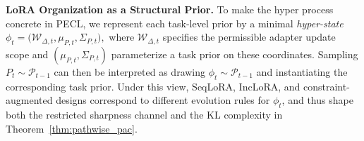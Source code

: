 \documentclass[10pt]{article} %
\begin{document}



\noindent\textbf{LoRA Organization as a Structural Prior.}\quad 
To make the hyper process concrete in PECL, we represent each task-level prior by a minimal \emph{hyper-state}
$
\phi_t = \bigl(\mathcal W_{\Delta,t},\mu_{P,t},\Sigma_{P,t}\bigr),
$
where $\mathcal W_{\Delta,t}$ specifies the permissible adapter update scope and $(\mu_{P,t},\Sigma_{P,t})$ parameterize a task prior on these coordinates.
Sampling $P_t\sim\mathcal P_{t-1}$ can then be interpreted as drawing $\phi_t\sim\mathcal P_{t-1}$ and instantiating the corresponding task prior. Under this view, SeqLoRA, IncLoRA, and constraint-augmented designs correspond to different evolution rules for $\phi_t$, and thus shape both the restricted sharpness channel and the KL complexity in Theorem~\ref{thm:pathwise_pac}.
\end{document}

